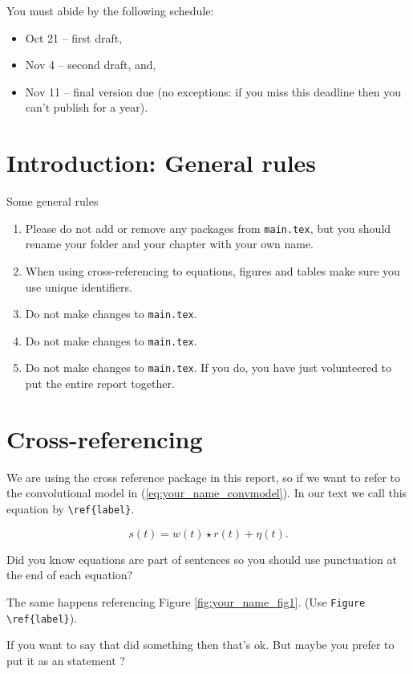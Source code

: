 You must  abide by the following schedule:
\begin{itemize}
  \item Oct 21 -- first draft,
  \item Nov 4 -- second draft, and,
  \item Nov 11 -- final version due (no exceptions: if you miss this deadline then you can't publish for a year).
\end{itemize}  

%
\section{Introduction: General rules}
%
Some general rules
\begin{enumerate}
\item Please do not add or remove any packages from \verb"main.tex", but you should rename your folder and your chapter with your own name. 
\item When using cross-referencing to equations, figures and tables make sure you use unique identifiers. 
\item Do not make changes to \verb"main.tex".
\item Do not make changes to \verb"main.tex".
\item Do not make changes to \verb"main.tex". If you do, you have just volunteered to put the entire report together. 
\end{enumerate}

%
\section{Cross-referencing}
%
We are using the cross reference package in this report, so if we want to refer to the convolutional model in (\ref{eq:your_name_convmodel}). In our text we call this equation by \verb"\ref{label}". 

\begin{equation}\label{eq:your_name_convmodel}
s(t) = w(t)\star r(t) + \eta(t).
\end{equation}

Did you know equations are part of sentences so you should use punctuation at the end of each equation?

The same happens referencing Figure \ref{fig:your_name_fig1}. (Use \verb"Figure \ref{label}"). 

If you want to say that \cite{VanderBaan2008} did something then that's ok.
But maybe you prefer to put it as an statement \citep{VanderBaan2008}?


